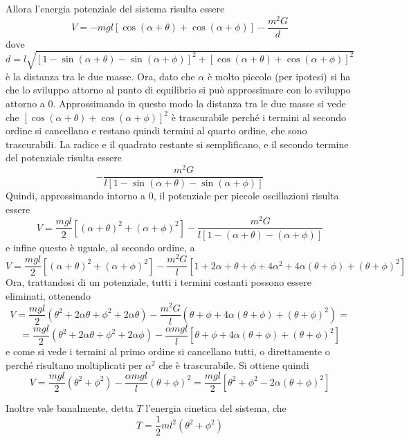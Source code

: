 \documentclass[../main.tex]{subfiles}
\begin{document}
Allora l'energia potenziale del sistema risulta essere 
$$V=-mgl\left[\cos(\alpha+\theta)+\cos(\alpha+\phi)\right]-\frac{m^2 G}{d}$$
dove $d=l\sqrt{\left[1-\sin(\alpha+\theta)-\sin(\alpha+\phi)\right]^2+\left[\cos(\alpha+\theta)+\cos(\alpha+\phi)\right]^2}$ è la distanza tra le due masse. Ora, dato che $\alpha$ è molto piccolo (per ipotesi) si ha che lo sviluppo attorno al punto di equilibrio si può approssimare con lo sviluppo attorno a 0. Approssimando in questo modo la distanza tra le due masse si vede che $\left[\cos(\alpha+\theta)+\cos(\alpha+\phi)\right]^2$ è trascurabile perché i termini al secondo ordine si cancellano e restano quindi termini al quarto ordine, che sono trascurabili. La radice e il quadrato restante si semplificano, e il secondo termine del potenziale risulta essere
$$-\frac{m^2 G}{l\left[1-\sin(\alpha+\theta)-\sin(\alpha+\phi)\right]} $$
Quindi, approssimando intorno a 0, il potenziale per piccole oscillazioni risulta essere
$$ V=\frac{mgl}{2}\left[(\alpha+\theta)^2+(\alpha+\phi)^2\right]-\frac{m^2 G}{l\left[1-(\alpha+\theta)-(\alpha+\phi)\right]} $$
e infine questo è uguale, al secondo ordine, a
$$ V=\frac{mgl}{2}\left[(\alpha+\theta)^2+(\alpha+\phi)^2\right]-\frac{m^2 G}{l}\left[1+2\alpha+\theta+\phi+4\alpha^2+4\alpha(\theta+\phi)+(\theta+\phi)^2\right] $$
Ora, trattandosi di un potenziale, tutti i termini costanti possono essere eliminati, ottenendo
$$ V=\frac{mgl}{2}(\theta^2+2\alpha\theta+\phi^2+2\alpha\theta)-\frac{m^2 G}{l}(\theta+\phi+4\alpha(\theta+\phi)+(\theta+\phi)^2)=$$
$$=\frac{mgl}{2}(\theta^2+2\alpha\theta+\phi^2+2\alpha\phi)-\frac{\alpha m g l}{l}\left[\theta+\phi+4\alpha(\theta+\phi)+(\theta+\phi)^2\right] $$
e come si vede i termini al primo ordine si cancellano tutti, o direttamente o perché risultano moltiplicati per $\alpha^2$ che è trascurabile. Si ottiene quindi
\begin{equation}\label{pig:Potenziale}
	V=\frac{mgl}{2}(\theta^2+\phi^2)-\frac{\alpha m g l}{l}(\theta+\phi)^2=\frac{mgl}{2}\left[\theta^2+\phi^2-2\alpha(\theta+\phi)^2\right]
\end{equation}

Inoltre vale banalmente, detta $T$ l'energia cinetica del sistema, che
\begin{equation}\label{pig:Cinetica}
	T=\frac12ml^2\left(\theta^2+\phi^2\right)
\end{equation}
\end{document}
